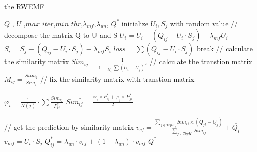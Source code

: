 \begin{algorithm}  
\caption{the RWEMF}  
\label{alg_RWEMF}  
\begin{algorithmic}
\REQUIRE $Q$ , $\overline{U}$ ,$max\_iter$,$min\_thr$,$\lambda_{mf}$,$\lambda_{un}$,
\ENSURE $Q^{*}$
\STATE initialize $U_{i},S_{j}$ with random value
\STATE // decompose the matrix Q to U and S
    \STATE $U_{i} =U_{i}-(Q_{ij}-U_{i} \cdot S_{j}) -\lambda_{mf} U_{i}$
    \STATE $S_{i} =S_{j}-(Q_{ij}-U_{i} \cdot S_{j}) -\lambda_{mf} S_{i}$
    \STATE $loss=\sum{(Q_{ij}-U_{i} \cdot S_{j})}$
        \STATE break
    \ENDIF 
\ENDFOR
\STATE // calculate the similarity matrix 
        \STATE $Sim_{ij}=\frac{1}{1+\frac{1}{N_{ij}}\sum{(U_{i}-U_{j})^2}}$
    \ENDFOR
\ENDFOR
\STATE // calculate the transtion matrix 
        \STATE $M_{ij}=\frac{Sim_{ij}}{Sim_{i}}$
    \ENDFOR
\ENDFOR
\STATE // fix the similarity matrix with transtion matrix

        \STATE $\varphi_{i}=\frac{1}{N(j)} \cdot \sum{\frac{Sim_{ij}}{P^{*}_{ij}}} $    
        \STATE $Sim_{ij}^{*}=\frac
{\varphi_{i} \times P^{*}_{ij} + \varphi_{j} \times P^{*}_{ji}
}{2}$
    \ENDFOR
\ENDFOR

\STATE // get the prediction by similarity matrix
        \STATE $v_{cf}=\frac{
  \sum_{j \in TopK_{i}}{Sim_{ij} \times (Q_{jk}-\overline{Q_{j}})}
  }{
  \sum_{j \in TopK_{i}}{Sim_{ij}}
}+\overline{Q_{i}} $    
        \STATE $v_{mf}= U_{i} \cdot S_{j}$
        \STATE $Q_{ij}^{*}= \lambda_{un} \cdot v_{cf} + (1-\lambda_{un}) \cdot v_{mf}$
    \ENDFOR
\ENDFOR
\RETURN $Q^{*}$

\end{algorithmic}  
\end{algorithm}  
